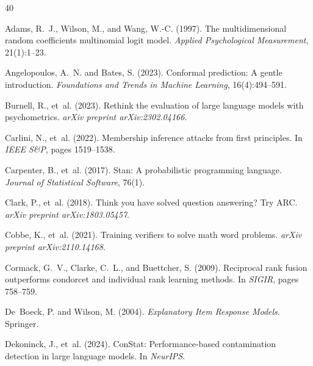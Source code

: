 \documentclass[11pt,a4paper]{article}
\begin{document}
%
%

\begin{thebibliography}{40}

Adams, R.~J., Wilson, M., and Wang, W.-C. (1997).
\newblock The multidimensional random coefficients multinomial logit model.
\newblock \emph{Applied Psychological Measurement}, 21(1):1--23.

Angelopoulos, A.~N. and Bates, S. (2023).
\newblock Conformal prediction: A gentle introduction.
\newblock \emph{Foundations and Trends in Machine Learning}, 16(4):494--591.

Burnell, R., et~al. (2023).
\newblock Rethink the evaluation of large language models with psychometrics.
\newblock \emph{arXiv preprint arXiv:2302.04166}.

Carlini, N., et~al. (2022).
\newblock Membership inference attacks from first principles.
\newblock In \emph{IEEE S\&P}, pages 1519--1538.

Carpenter, B., et~al. (2017).
\newblock Stan: A probabilistic programming language.
\newblock \emph{Journal of Statistical Software}, 76(1).

Clark, P., et~al. (2018).
\newblock Think you have solved question answering? Try ARC.
\newblock \emph{arXiv preprint arXiv:1803.05457}.

Cobbe, K., et~al. (2021).
\newblock Training verifiers to solve math word problems.
\newblock \emph{arXiv preprint arXiv:2110.14168}.

Cormack, G.~V., Clarke, C.~L., and Buettcher, S. (2009).
\newblock Reciprocal rank fusion outperforms condorcet and individual rank learning methods.
\newblock In \emph{SIGIR}, pages 758--759.

De~Boeck, P. and Wilson, M. (2004).
\newblock \emph{Explanatory Item Response Models}.
\newblock Springer.

Dekoninck, J., et~al. (2024).
\newblock ConStat: Performance-based contamination detection in large language models.
\newblock In \emph{NeurIPS}.


\end{thebibliography}
\end{document}
